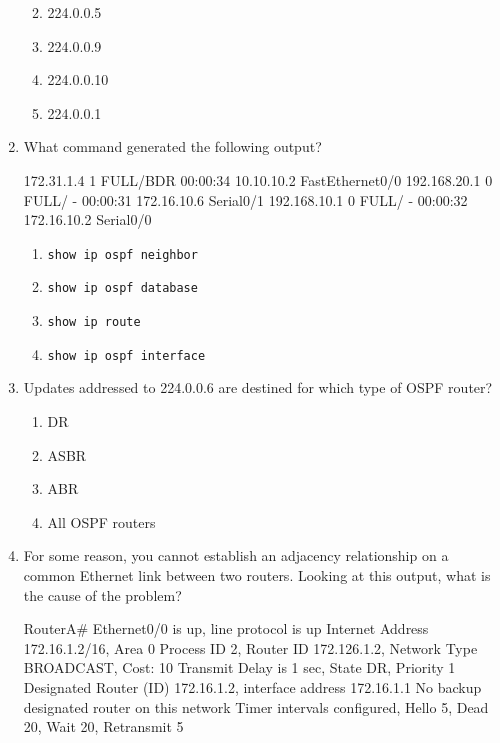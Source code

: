 \begin{enumerate}
  \begin{enumerate}
  \def\labelenumii{\Alph{enumii}.}
    \item
    224.0.0.5
  \item
    224.0.0.9
  \item
    224.0.0.10
  \item
    224.0.0.1
  \end{enumerate}
\item
  What command generated the following output?

\begin{cli}
172.31.1.4        1   FULL/BDR   00:00:34    10.10.10.2     FastEthernet0/0
192.168.20.1      0   FULL/  -   00:00:31    172.16.10.6     Serial0/1
192.168.10.1      0   FULL/  -   00:00:32    172.16.10.2     Serial0/0
\end{cli}

  \begin{enumerate}
  \def\labelenumii{\Alph{enumii}.}
    \item
    \texttt{show\ ip\ ospf\ neighbor}
  \item
    \texttt{show\ ip\ ospf\ database}
  \item
    \texttt{show\ ip\ route}
  \item
    \texttt{show\ ip\ ospf\ interface}
  \end{enumerate}
\item
  Updates addressed to 224.0.0.6 are destined for which type of OSPF
  router?

  \begin{enumerate}
  \def\labelenumii{\Alph{enumii}.}
    \item
    DR
  \item
    ASBR
  \item
    \protect\hypertarget{c18.xhtmlux5cux23Page_779}{}{}ABR
  \item
    All OSPF routers
  \end{enumerate}
\item
  For some reason, you cannot establish an adjacency relationship on a
  common Ethernet link between two routers. Looking at this output, what
  is the cause of the problem?

\begin{cli}
RouterA#
Ethernet0/0 is up, line protocol is up
  Internet Address 172.16.1.2/16, Area 0
  Process ID 2, Router ID 172.126.1.2, Network Type BROADCAST, Cost: 10
  Transmit Delay is 1 sec, State DR, Priority 1
  Designated Router (ID) 172.16.1.2, interface address 172.16.1.1
  No backup designated router on this network
  Timer intervals configured, Hello 5, Dead 20, Wait 20, Retransmit 5


\end{cli}
\end{enumerate}
